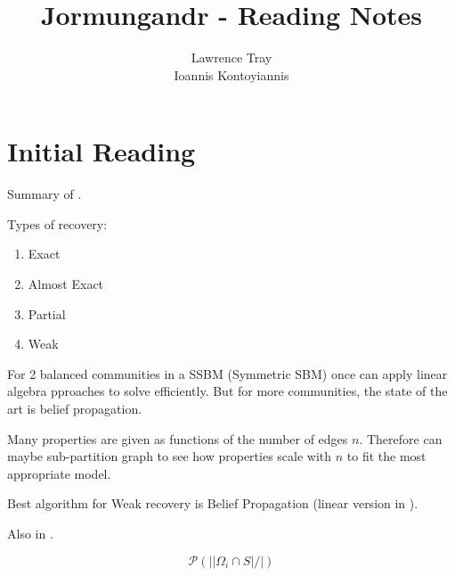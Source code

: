 \documentclass[]{article}
\title{Jormungandr - Reading Notes}
\author{Lawrence Tray \\ Ioannis Kontoyiannis}
\begin{document}
\maketitle

\section{Initial Reading}

Summary of \cite{Abbe}.

Types of recovery:
\begin{enumerate}
	\item Exact
	\item Almost Exact
	\item Partial
	\item Weak
\end{enumerate}

For 2 balanced communities in a SSBM (Symmetric SBM) once can apply linear algebra pproaches to solve efficiently. But for more communities, the state of the art is belief propagation. 

Many properties are given as functions of the number of edges $n$. Therefore can maybe sub-partition graph to see how properties scale with $n$ to fit the most appropriate model.

Best algorithm for Weak recovery is Belief Propagation (linear version in \cite{Linear-ABP}).

Also in \cite{SBM-Achieve}.

\begin{equation}
	\mathcal{P} (||\Omega_i \cap S| / |)
\end{equation}

\nocite{*}
\printbibliography
\end{document}
